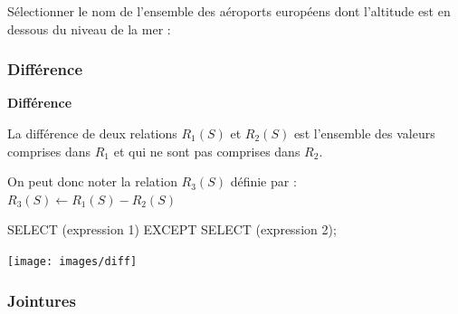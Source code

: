 \documentclass[10pt]{article}
\newif\ifprofvar
\begin{document}
\begin{exemple}
Sélectionner le nom de l'ensemble des aéroports européens dont l'altitude est en dessous du niveau de la mer :
\ifprofvar
$$
\pi_{\text{name}}\left(\sigma_{\text{continent}=''EU''}(\text{airports}) \cap \sigma_{\text{elevation\_ft}\leq0}(\text{airports}) \right)
$$
\begin{envsql}
\begin{sql}
SELECT name FROM airports WHERE continent=''EU''
    INTERSECT SELECT name FROM airports WHERE elevation_ft<=0;
\end{sql}
\end{envsql}
\else
\vspace{4cm}
\fi

\end{exemple}


\subsubsection{Différence}
\begin{defi}
\begin{minipage}[c]{.75\linewidth}
\textbf{Différence}

La différence de deux relations $R_1(S)$ et $R_2(S)$ est l'ensemble des valeurs comprises dans $R_1$ et qui ne sont pas comprises dans $R_2$. 

On peut donc noter la relation $R_3(S)$ définie par : $R_3(S)\leftarrow R_1(S)-R_2(S)$

\begin{envsql}
\begin{sql}
SELECT  (expression 1) EXCEPT SELECT (expression 2);
\end{sql}
\end{envsql}

\end{minipage}\hfill
\begin{minipage}[c]{.2\linewidth}
\begin{center}
\texttt{[image: images/diff]}
\end{center}
\end{minipage}
\end{defi}

\subsubsection{Jointures}
\end{document}
